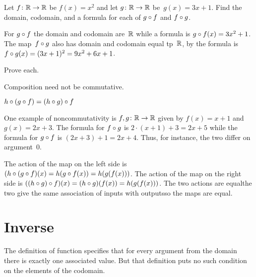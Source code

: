 \documentclass{ibl}
\begin{document}
\begin{ex}
Let $\mbox{$f\colon \mathbb{R}\to \mathbb{R}$}$ be $f(x)=x^2$ and let $\mbox{$g\colon \mathbb{R}\to \mathbb{R}$}$ be~$g(x)=3x+1$.
Find the domain, codomain, and a formula for each of
$g\mathbin{\circ} f$ and $f\mathbin{\circ} g$.  
\begin{ans}
For $g\mathbin{\circ} f$ the domain and codomain are~$\mathbb{R}$ while a formula is
$g\mathbin{\circ} f(x)=3x^2+1$.
The map~$f\mathbin{\circ} g$ also has domain and codomain equal tp~$\mathbb{R}$,
by the formula is~$f\mathbin{\circ} g(x)=(3x+1)^2=9x^2+6x+1$.
\end{ans}
\end{ex}

\begin{ex} Prove each.
\begin{exes}
\item Composition need not be commutative.
\item{} 
  $h\mathbin{\circ} (g\mathbin{\circ} f)=(h\mathbin{\circ} g)\mathbin{\circ} f$    
\end{exes}
\begin{ans}
\begin{exes}
\item One example of noncommutativity is $\mbox{$f,g\colon \mathbb{R}\to \mathbb{R}$}$ given by 
  $f(x)=x+1$ and $g(x)=2x+3$.
  The formula for $f\mathbin{\circ} g$ is $2\cdot(x+1)+3=2x+5$ while
  the formula for $g\mathbin{\circ} f$ is $(2x+3)+1=2x+4$.
  Thus, for instance, the two differ on argument~$0$.
\item The action of the map on the left side
  is $(h\mathbin{\circ} (g\mathbin{\circ} f)(x)=h(g\mathbin{\circ} f(x))
       =h(g(f(x)))$.
  The action of the map on the right side  
  is $((h\mathbin{\circ} g)\mathbin{\circ} f)(x)=(h\mathbin{\circ} g)(f(x))
      =h(g(f(x)))$.
  The two actions are equal\Dash the two give the same association of inputs
  with outputs\Dash so the maps are equal.
\end{exes}
\end{ans}
\end{ex}





\section{Inverse}

The definition of function specifies that for every argument from the
domain there is 
exactly one associated value.
But that definition puts no such condition on the elements of the codomain.
\end{document}
